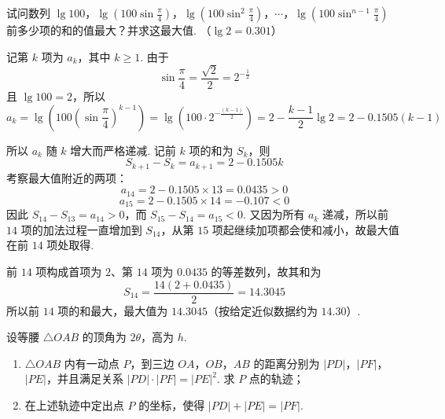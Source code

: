 \documentclass[UTF8,a4paper,oneside,11pt]{ctexbook}
\begin{document}
\begin{problem}
试问数列 \(\lg 100\)，\(\lg \left(100\sin \frac{\pi}{4}\right)\)，\(\lg \left(100\sin^{2}\frac{\pi}{4}\right)\)，\(\cdots\)，\(\lg \left(100\sin^{n-1}\frac{\pi}{4}\right)\) 前多少项的和的值最大？并求这最大值. （\(\lg 2 = 0.301\)）
\end{problem}

\begin{solution}
记第 \(k\) 项为 \(a_k\)，其中 \(k\geq1\). 由于
\[
\sin\frac{\pi}{4}=\frac{\sqrt{2}}{2}=2^{-\frac{1}{2}}
\]
且 \(\lg100=2\)，所以
\[
a_k=\lg\left(100\left(\sin\frac{\pi}{4}\right)^{k-1}\right)
=\lg\left(100\cdot2^{-\frac{(k-1)}{2}}\right)
=2-\frac{k-1}{2}\lg2
=2-0.1505(k-1)
\]

所以 \(a_k\) 随 \(k\) 增大而严格递减. 记前 \(k\) 项的和为 \(S_k\)，则
\[
S_{k+1}-S_k=a_{k+1}=2-0.1505k
\]
考察最大值附近的两项：
\[
a_{14}=2-0.1505\times13=0.0435>0
\]
\[
a_{15}=2-0.1505\times14=-0.107<0
\]
因此 \(S_{14}-S_{13}=a_{14}>0\)，而 \(S_{15}-S_{14}=a_{15}<0\). 又因为所有 \(a_k\) 递减，所以前 \(14\) 项的加法过程一直增加到 \(S_{14}\)，从第 \(15\) 项起继续加项都会使和减小，故最大值在前 \(14\) 项处取得.

前 \(14\) 项构成首项为 \(2\)、第 \(14\) 项为 \(0.0435\) 的等差数列，故其和为
\[
S_{14}=\frac{14(2+0.0435)}{2}=14.3045
\]
所以前 \(14\) 项的和最大，最大值为 \(14.3045\)（按给定近似数据约为 \(14.30\)）.
\end{solution}

\begin{problem}
设等腰 \(\triangle OAB\) 的顶角为 \(2\theta\)，高为 \(h\).

\begin{enumerate}
\item \(\triangle OAB\) 内有一动点 \(P\)，到三边 \(OA\)，\(OB\)，\(AB\) 的距离分别为 \(\lvert PD\rvert\)，\(\lvert PF\rvert\)，\(\lvert PE\rvert\)，并且满足关系 \(\lvert PD\rvert \cdot \lvert PF\rvert = \lvert PE\rvert^2\). 求 \(P\) 点的轨迹；
\item 在上述轨迹中定出点 \(P\) 的坐标，使得 \(\lvert PD\rvert + \lvert PE\rvert = \lvert PF\rvert\).
\end{enumerate}
\end{problem}
\end{document}
